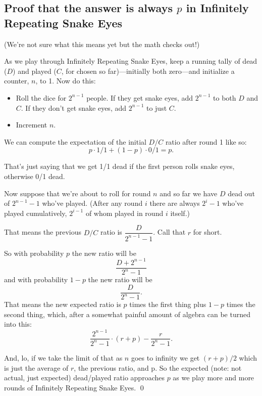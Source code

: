 \documentclass[article,twocolumn]{memoir}
\begin{document}
\subsection{Proof that the answer is always $p$ in Infinitely Repeating Snake Eyes}

(We're not sure what this means yet but the math checks out!)

As we play through Infinitely Repeating Snake Eyes, keep a running tally of dead ($D$) and played ($C$, for chosen so far)---initially both zero---and initialize a counter, $n$, to 1.
Now do this:
\begin{itemize}
\item Roll the dice for $2^{n-1}$ people.
If they get snake eyes, add $2^{n-1}$ to both $D$ and $C$.
If they don't get snake eyes, add $2^{n-1}$ to just $C$.
\item Increment $n$.
\end{itemize}

We can compute the expectation of the initial $D/C$ ratio after round 1 like so:
$$p\cdot 1/1 + (1-p)\cdot 0/1 = p.$$

That's just saying that we get 1/1 dead if the first person rolls snake eyes, otherwise 0/1 dead.

Now suppose that we're about to roll for round $n$ and so far we have $D$ dead out of $2^{n-1}-1$ who've played. 
(After any round $i$ there are always $2^i-1$ who've played cumulatively, $2^{i-1}$ of whom played in round $i$ itself.)

That means the previous $D/C$ ratio is $\dfrac{D}{2^{n-1}-1}$.
Call that $r$ for short.

So with probability $p$ the new ratio will be 
$$\frac{D + 2^{n-1}}{2^n-1}$$
and with probability $1-p$  the new ratio will be 
$$\frac{D}{2^n-1}.$$
That means the new expected ratio is $p$ times the first thing plus $1-p$ times the second thing, which, after a somewhat painful amount of algebra can be turned into this:
$$\frac{2^{n-1}}{2^n - 1} \cdot (r + p) - \frac{r}{2^n-1}.$$

And, lo, if we take the limit of that as $n$ goes to infinity we get $(r+p)/2$ which is just the average of $r$, the previous ratio, and p.
So the expected (note: not actual, just expected) dead/played ratio approaches $p$ as we play more and more rounds of Infinitely Repeating Snake Eyes.
\qed
\end{document}
